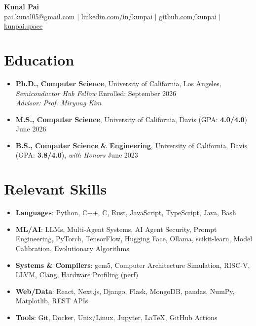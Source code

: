 \documentclass[letterpaper,10pt]{article}
\begin{document}
{\Large
\begin{center}
  \textbf{\Huge Kunal Pai} \\
  \small \href{mailto:pai.kunal05@gmail.com}{pai.kunal05@gmail.com} $|$ \href{https://linkedin.com/in/kunpai}{linkedin.com/in/kunpai} $|$ \href{https://github.com/kunpai}{github.com/kunpai} $|$ \href{https://www.kunpai.space}{kunpai.space}
\end{center}
}

\section{Education}
{\normalsize
\begin{itemize}[leftmargin=0.15in, label={}, itemsep=0pt]
  \item \textbf{Ph.D., Computer Science}, University of California, Los Angeles, \textit{Semiconductor Hub Fellow} \hfill Enrolled: September 2026 \\ \textit{Advisor: Prof. Miryung Kim}
  \item \textbf{M.S., Computer Science}, University of California, Davis (GPA: \textbf{4.0/4.0}) \hfill June 2026
  \item \textbf{B.S., Computer Science \& Engineering}, University of California, Davis (GPA: \textbf{3.8/4.0}), \textit{with Honors} \hfill June 2023
\end{itemize}
}

\section{Relevant Skills}
{\normalsize
\begin{itemize}[leftmargin=0.15in, label={}, itemsep=0pt]
  \item \textbf{Languages}: Python, C++, C, Rust, JavaScript, TypeScript, Java, Bash
  \item \textbf{ML/AI}: LLMs, Multi-Agent Systems, AI Agent Security, Prompt Engineering, PyTorch, TensorFlow, Hugging Face, Ollama, scikit-learn, Model Calibration, Evolutionary Algorithms
  \item \textbf{Systems \& Compilers}: gem5, Computer Architecture Simulation, RISC-V, LLVM, Clang, Hardware Profiling (perf)
  \item \textbf{Web/Data}: React, Next.js, Django, Flask, MongoDB, pandas, NumPy, Matplotlib, REST APIs
  \item \textbf{Tools}: Git, Docker, Unix/Linux, Jupyter, LaTeX, GitHub Actions
\end{itemize}
}
\end{document}
